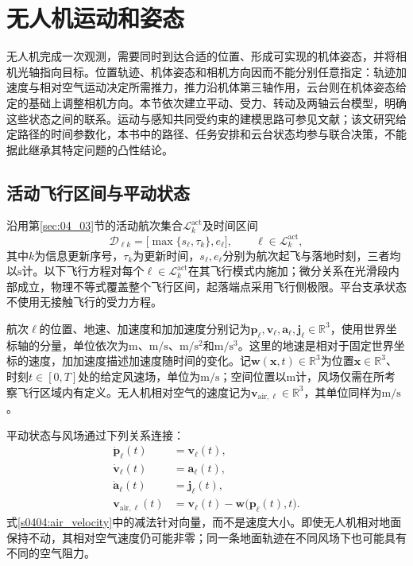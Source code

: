 \section{无人机运动和姿态}
\label{sec:04_04}

无人机完成一次观测，需要同时到达合适的位置、形成可实现的机体姿态，并将相机光轴指向目标。位置轨迹、机体姿态和相机方向因而不能分别任意指定：轨迹加速度与相对空气运动决定所需推力，推力沿机体第三轴作用，云台则在机体姿态给定的基础上调整相机方向。本节依次建立平动、受力、转动及两轴云台模型，明确这些状态之间的联系。运动与感知共同受约束的建模思路可参见文献\cite{Spasojevic2020}；该文研究给定路径的时间参数化，本书中的路径、任务安排和云台状态均参与联合决策，不能据此继承其特定问题的凸性结论。

\subsection{活动飞行区间与平动状态}

沿用第\ref{sec:04_03}节的活动航次集合$\mathcal L_k^{\mathrm{act}}$及时间区间
\begin{equation}
 \mathcal D_{\ell k}
 =\bigl[\max\{s_\ell,\tau_k\},e_\ell\bigr],
 \qquad \ell\in\mathcal L_k^{\mathrm{act}},
 \label{s0404:flight_domain}
\end{equation}
其中$k$为信息更新序号，$\tau_k$为更新时间，$s_\ell,e_\ell$分别为航次起飞与落地时刻，三者均以$\mathrm s$计。以下飞行方程对每个$\ell\in\mathcal L_k^{\mathrm{act}}$在其飞行模式内施加；微分关系在光滑段内部成立，物理不等式覆盖整个飞行区间，起落端点采用飞行侧极限。平台支承状态不使用无接触飞行的受力方程。

航次$\ell$的位置、地速、加速度和加加速度分别记为$\mathbf p_\ell,\mathbf v_\ell,\mathbf a_\ell,\mathbf j_\ell\in\mathbb R^3$，使用世界坐标轴的分量，单位依次为$\mathrm m$、$\mathrm{m/s}$、$\mathrm{m/s^2}$和$\mathrm{m/s^3}$。这里的地速是相对于固定世界坐标的速度，加加速度描述加速度随时间的变化。记$\mathbf w(\mathbf x,t)\in\mathbb R^3$为位置$\mathbf x\in\mathbb R^3$、时刻$t\in[0,T]$处的给定风速场，单位为$\mathrm{m/s}$；空间位置以$\mathrm m$计，风场仅需在所考察飞行区域内有定义。无人机相对空气的速度记为$\mathbf v_{\mathrm{air},\ell}\in\mathbb R^3$，其单位同样为$\mathrm{m/s}$。

平动状态与风场通过下列关系连接：
\begin{subequations}
\label{s0404:translation}
\begin{align}
 \dot{\mathbf p}_\ell(t)&=\mathbf v_\ell(t),
 \label{s0404:position_rate}\\
 \dot{\mathbf v}_\ell(t)&=\mathbf a_\ell(t),
 \label{s0404:velocity_rate}\\
 \dot{\mathbf a}_\ell(t)&=\mathbf j_\ell(t),
 \label{s0404:acceleration_rate}\\
 \mathbf v_{\mathrm{air},\ell}(t)
 &=\mathbf v_\ell(t)-\mathbf w\bigl(\mathbf p_\ell(t),t\bigr).
 \label{s0404:air_velocity}
\end{align}
\end{subequations}
式\eqref{s0404:air_velocity}中的减法针对向量，而不是速度大小。即使无人机相对地面保持不动，其相对空气速度仍可能非零；同一条地面轨迹在不同风场下也可能具有不同的空气阻力。

